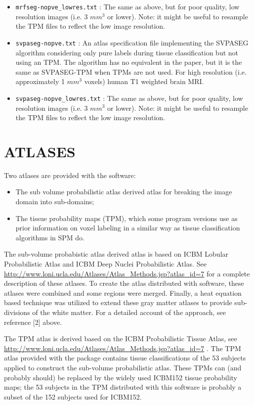 \documentclass[12pt]{article}
\begin{document}
\begin{itemize}
\item {\tt mrfseg-nopve\_lowres.txt} : The same as above, but for poor quality, low resolution images (i.e. 3 $mm^3$ or lower). Note: it might be useful to resample the TPM files to reflect the low image resolution. 

\item {\tt  svpaseg-nopve.txt} :  An atlas specification file implementing the SVPASEG algorithm considering only pure labels during tissue classification but not using an TPM. The algorithm has no equivalent in the paper, but it is the same as SVPASEG-TPM when TPMs are not used. For high resolution (i.e. approximately 1 $mm^3$ voxels) human T1 weighted brain MRI.

\item {\tt svpaseg-nopve\_lowres.txt} : The same as above, but for poor quality, low resolution images (i.e. 3 $mm^3$ or lower). Note: it might be useful to resample the TPM files to reflect the low image resolution. 

\end{itemize}

\section{ATLASES}

Two atlases are provided with the software:

\begin{itemize}
\item The sub volume probabilistic atlas derived atlas for breaking the image domain into sub-domains;
\item The tissue probability maps (TPM), which some program versions use as prior information on voxel labeling in a similar way as tissue classification algorithms in SPM do. 
\end{itemize} 

The sub-volume probabistic atlas derived atlas is based on ICBM Lobular Probabilistic Atlas
and ICBM Deep Nuclei Probabilistic Atlas. See \url{http://www.loni.ucla.edu/Atlases/Atlas_Methods.jsp?atlas_id=7} for a complete description of these atlases. To create the atlas distributed with software, these atlases were combined and some regions were merged. Finally, a heat equation based technique was utilized to extend these gray matter atlases to provide sub-divisions of the white matter. For a detailed account of the approach, see reference [2] above. 

The TPM atlas is derived based on the ICBM Probabilistic Tissue Atlas, see    \url{http://www.loni.ucla.edu/Atlases/Atlas_Methods.jsp?atlas_id=7} . The TPM atlas provided with the package contains tissue classifications of the 53 subjects applied to construct the sub-volume probabilistic atlas. These TPMs can (and probably should) be replaced by the widely used ICBM152 tissue probability maps; the 53 subjects in the TPM distributed with this software is probably a subset of the 152 subjects used for ICBM152.   
\end{document}
